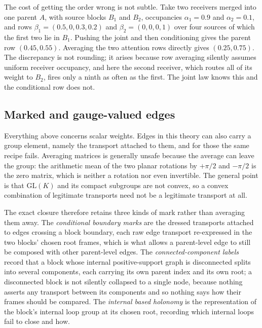\documentclass[11pt,letterpaper]{article}
\begin{document}
The cost of getting the order wrong is not subtle. Take two receivers merged into one parent \(A\), with source blocks \(B_1\) and \(B_2\), occupancies \(\alpha_1=0.9\) and \(\alpha_2=0.1\), and rows \(\beta_1=(0.5,0,0.3,0.2)\) and \(\beta_2=(0,0,0,1)\) over four sources of which the first two lie in \(B_1\). Pushing the joint and then conditioning gives the parent row \((0.45,0.55)\). Averaging the two attention rows directly gives \((0.25,0.75)\). The discrepancy is not rounding; it arises because row averaging silently assumes uniform receiver occupancy, and here the second receiver, which routes all of its weight to \(B_2\), fires only a ninth as often as the first. The joint law knows this and the conditional row does not.

\subsection{Marked and gauge-valued edges}

Everything above concerns scalar weights. Edges in this theory can also carry a group element, namely the transport attached to them, and for those the same recipe fails. Averaging matrices is generally unsafe because the average can leave the group: the arithmetic mean of the two planar rotations by \(+\pi/2\) and \(-\pi/2\) is the zero matrix, which is neither a rotation nor even invertible. The general point is that \(\mathrm{GL}(K)\) and its compact subgroups are not convex, so a convex combination of legitimate transports need not be a legitimate transport at all.

The exact closure therefore retains three kinds of mark rather than averaging them away. The \emph{conditional boundary marks} are the dressed transports attached to edges crossing a block boundary, each raw edge transport re-expressed in the two blocks' chosen root frames, which is what allows a parent-level edge to still be composed with other parent-level edges. The \emph{connected-component labels} record that a block whose internal positive-support graph is disconnected splits into several components, each carrying its own parent index and its own root; a disconnected block is not silently collapsed to a single node, because nothing asserts any transport between its components and so nothing says how their frames should be compared. The \emph{internal based holonomy} is the representation of the block's internal loop group at its chosen root, recording which internal loops fail to close and how.
\end{document}
